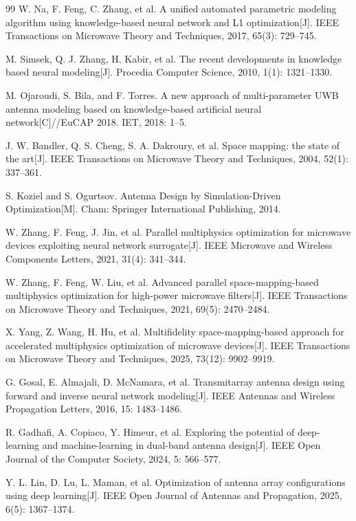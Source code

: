 \documentclass[UTF8,a4paper,12pt]{ctexart}
\begin{document}
\begin{thebibliography}{99}
 W. Na, F. Feng, C. Zhang, et al. A unified automated parametric modeling algorithm using knowledge-based neural network and L1 optimization[J]. IEEE Transactions on Microwave Theory and Techniques, 2017, 65(3): 729--745.

 M. Simsek, Q. J. Zhang, H. Kabir, et al. The recent developments in knowledge based neural modeling[J]. Procedia Computer Science, 2010, 1(1): 1321--1330.

 M. Ojaroudi, S. Bila, and F. Torres. A new approach of multi-parameter UWB antenna modeling based on knowledge-based artificial neural network[C]//EuCAP 2018. IET, 2018: 1--5.

 J. W. Bandler, Q. S. Cheng, S. A. Dakroury, et al. Space mapping: the state of the art[J]. IEEE Transactions on Microwave Theory and Techniques, 2004, 52(1): 337--361.

 S. Koziel and S. Ogurtsov. Antenna Design by Simulation-Driven Optimization[M]. Cham: Springer International Publishing, 2014.

 W. Zhang, F. Feng, J. Jin, et al. Parallel multiphysics optimization for microwave devices exploiting neural network surrogate[J]. IEEE Microwave and Wireless Components Letters, 2021, 31(4): 341--344.

 W. Zhang, F. Feng, W. Liu, et al. Advanced parallel space-mapping-based multiphysics optimization for high-power microwave filters[J]. IEEE Transactions on Microwave Theory and Techniques, 2021, 69(5): 2470--2484.

 X. Yang, Z. Wang, H. Hu, et al. Multifidelity space-mapping-based approach for accelerated multiphysics optimization of microwave devices[J]. IEEE Transactions on Microwave Theory and Techniques, 2025, 73(12): 9902--9919.

 G. Gosal, E. Almajali, D. McNamara, et al. Transmitarray antenna design using forward and inverse neural network modeling[J]. IEEE Antennas and Wireless Propagation Letters, 2016, 15: 1483--1486.

 R. Gadhafi, A. Copiaco, Y. Himeur, et al. Exploring the potential of deep-learning and machine-learning in dual-band antenna design[J]. IEEE Open Journal of the Computer Society, 2024, 5: 566--577.

 Y. L. Lin, D. Lu, L. Maman, et al. Optimization of antenna array configurations using deep learning[J]. IEEE Open Journal of Antennas and Propagation, 2025, 6(5): 1367--1374.


\end{thebibliography}
\end{document}

